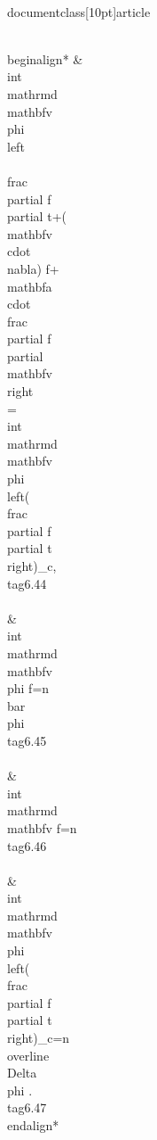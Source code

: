 \\documentclass[10pt]{article}
\begin{document}
{{{{\\begin{align*}
& \\int \\mathrm{d} \\mathbf{v} \\phi\\left\\{\\frac{\\partial f}{\\partial t}+(\\mathbf{v} \\cdot \\nabla) f+\\mathbf{a} \\cdot \\frac{\\partial f}{\\partial \\mathbf{v}}\\right\\}=\\int \\mathrm{d} \\mathbf{v} \\phi\\left(\\frac{\\partial f}{\\partial t}\\right)_{c},  \\tag{6.44}\\\\
& \\int \\mathrm{d} \\mathbf{v} \\phi f=n \\bar{\\phi}  \\tag{6.45}\\\\
& \\int \\mathrm{d} \\mathbf{v} f=n  \\tag{6.46}\\\\
& \\int \\mathrm{d} \\mathbf{v} \\phi\\left(\\frac{\\partial f}{\\partial t}\\right)_{c}=n \\overline{\\Delta \\phi} . \\tag{6.47}
\\end{align*}


}}}}
\end{document}
